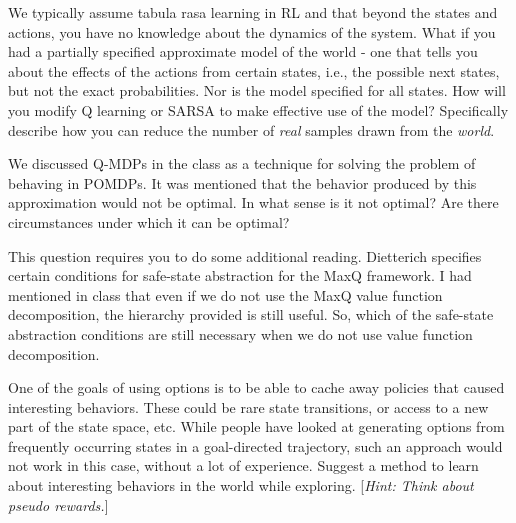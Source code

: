 \documentclass[addpoints,12pt,solution]{exam}
\begin{document}
\begin{questions}
\begin{enumerate}[label=(\alph*)]
\begin{solution}
            \end{solution}
        \end{enumerate}


        \question[5] We typically assume tabula rasa learning in RL and that beyond the states and actions, you have no knowledge about the dynamics of the system. What if you had a partially specified approximate model of the world - one that tells you about the effects of the actions from certain states, i.e., the possible next states, but not the exact probabilities. Nor is the model specified for all states. How will you modify Q learning or SARSA to make effective use of the model? Specifically describe how you can reduce the number of \textit{real} samples drawn from the \textit{world}.
        \begin{solution}


        \end{solution}

        \question[4] We discussed Q-MDPs in the class as a technique for solving the problem of behaving in POMDPs. It was mentioned that the behavior produced by this approximation would not be optimal. In what sense is it not optimal? Are there circumstances under which it can be optimal?

        \begin{solution}

        \end{solution}

        \question[3] This question requires you to do some additional reading. Dietterich specifies certain conditions for safe-state abstraction for the MaxQ framework. I had mentioned in class that even if we do not use the MaxQ value function decomposition, the hierarchy provided is still useful. So, which of the safe-state abstraction conditions are still necessary when we do not use value function decomposition.
        \begin{solution}


        \end{solution}

        \question[4] One of the goals of using options is to be able to cache away policies that caused interesting behaviors. These could be rare state transitions, or access to a new part of the state space, etc. While people have looked at generating options from frequently occurring states in a goal-directed trajectory, such an approach would not work in this case, without a lot of experience. Suggest a method to learn about interesting behaviors in the world while exploring. [\textit{Hint: Think about pseudo rewards.}]
        \begin{solution}

        \end{solution}

    \end{questions}
\end{document}
